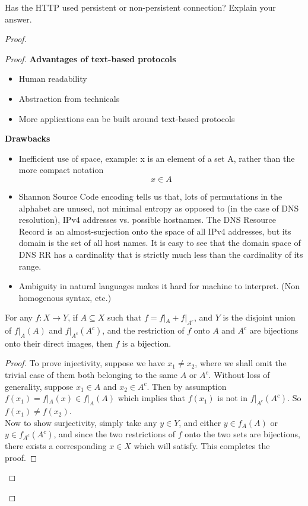 \documentclass[../../main.tex]{subfiles}
\begin{document}
\begin{wts}
Has the HTTP used persistent or non-persistent connection? Explain your answer.  
\end{wts}
\begin{proof}
\begin{proof}
\textbf{Advantages of text-based protocols}
\begin{itemize}
    \item Human readability
    \item Abstraction from technicals
    \item More applications can be built around text-based protocols
\end{itemize}
\textbf{Drawbacks}
\begin{itemize}
    \item Inefficient use of space, example: x is an element of a set A, rather than the more compact notation\[x\in A\]
    \item Shannon Source Code encoding tells us that, lots of permutations in the alphabet are unused, not minimal entropy as opposed to (in the case of DNS resolution), IPv4 addresses vs. possible hostnames. The DNS Resource Record is an almost-surjection onto the space of all IPv4 addresses, but its domain is the set of all host names. It is easy to see that the domain space of DNS RR has a cardinality that is strictly much less than the cardinality of its range.
    \item Ambiguity in natural languages makes it hard for machine to interpret. (Non homogenous syntax, etc.)
\end{itemize}
\begin{wts}\label{theorem:piecewise bijective with disjoint ranges, implies bijective}
For any $f: X\to Y$, if $A\subseteq X$ such that $f = f|_A + f|_{A^c}$, and $Y$ is the disjoint union of $f|_A(A)$ and $f|_{A^c}(A^c)$, and the restriction of $f$ onto $A$ and $A^c$ are bijections onto their direct images, then $f$ is a bijection. 
\end{wts}
\begin{proof}
To prove injectivity, suppose we have $x_1 \neq x_2$, where we shall omit the trivial case of them both belonging to the same $A$ or $A^c$. Without loss of generality, suppose $x_1\in A$ and $x_2\in A^c$. Then by assumption $f(x_1) = f|_A(x)\in f|_A(A)$ which implies that $f(x_1)$ is not in $f|_{A^c}(A^c)$. So $f(x_1)\neq f(x_2)$.\\

Now to show surjectivity, simply take any $y\in Y$, and either $y\in f_A(A)$ or $y\in f_{A^c}(A^c)$, and since the two restrictions of $f$ onto the two sets are bijections, there exists a corresponding $x\in X$ which will satisfy. This completes the proof.
\end{proof}
\end{proof}
\end{proof}
\end{document}
